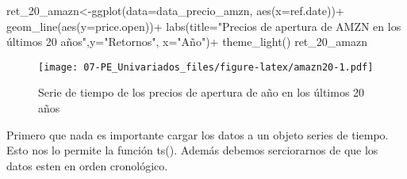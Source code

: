 \documentclass[
]{book}
\newenvironment{Shaded}{\begin{snugshade}}{\end{snugshade}}
\newcommand{\AttributeTok}[1]{\textcolor[rgb]{0.77,0.63,0.00}{#1}}
\newcommand{\FunctionTok}[1]{\textcolor[rgb]{0.00,0.00,0.00}{#1}}
\newcommand{\NormalTok}[1]{#1}
\newcommand{\OtherTok}[1]{\textcolor[rgb]{0.56,0.35,0.01}{#1}}
\newcommand{\SpecialCharTok}[1]{\textcolor[rgb]{0.00,0.00,0.00}{#1}}
\newcommand{\StringTok}[1]{\textcolor[rgb]{0.31,0.60,0.02}{#1}}
\begin{document}
\begin{Shaded}
\begin{Highlighting}[]
\NormalTok{ret\_20\_amazn}\OtherTok{\textless{}{-}}\FunctionTok{ggplot}\NormalTok{(}\AttributeTok{data=}\NormalTok{data\_precio\_amzn, }\FunctionTok{aes}\NormalTok{(}\AttributeTok{x=}\NormalTok{ref.date))}\SpecialCharTok{+}
  \FunctionTok{geom\_line}\NormalTok{(}\FunctionTok{aes}\NormalTok{(}\AttributeTok{y=}\NormalTok{price.open))}\SpecialCharTok{+}
  \FunctionTok{labs}\NormalTok{(}\AttributeTok{title=}\StringTok{"Precios de apertura de AMZN en los últimos 20 años"}\NormalTok{,}\AttributeTok{y=}\StringTok{"Retornos"}\NormalTok{, }\AttributeTok{x=}\StringTok{"Año"}\NormalTok{)}\SpecialCharTok{+}
  \FunctionTok{theme\_light}\NormalTok{()}
\NormalTok{ret\_20\_amazn}
\end{Highlighting}
\end{Shaded}

\begin{figure}
\centering
\texttt{[image: 07-PE\_Univariados\_files/figure-latex/amazn20-1.pdf]}
\caption{\label{fig:amazn20}Serie de tiempo de los precios de apertura de año en los últimos 20 años}
\end{figure}

Primero que nada es importante cargar los datos a un objeto series de
tiempo. Esto nos lo permite la función ts(). Además debemos serciorarnos
de que los datos esten en orden cronológico.
\end{document}
